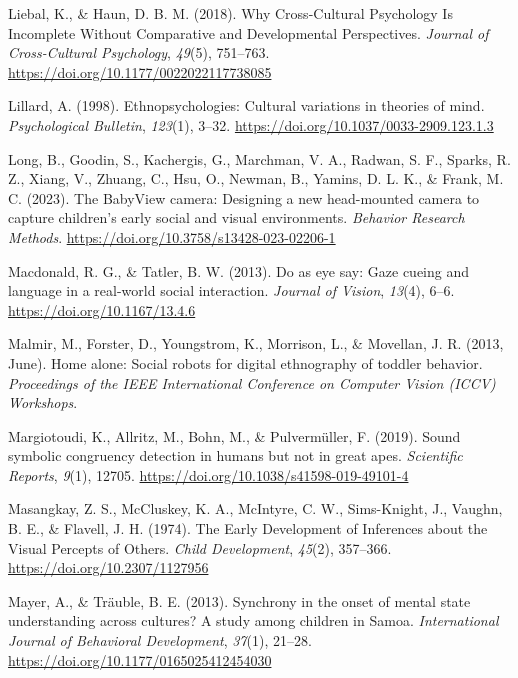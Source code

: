 \documentclass[
]{scrbook}
\newlength{\cslhangindent}
\newenvironment{CSLReferences}[2] %
 {\begin{list}{}{%
  \setlength{\itemindent}{0pt}
  \setlength{\leftmargin}{0pt}
  \setlength{\parsep}{0pt}
  \ifodd #1
   \setlength{\leftmargin}{\cslhangindent}
   \setlength{\itemindent}{-1\cslhangindent}
  \fi
  \setlength{\itemsep}{#2\baselineskip}}}
 {\end{list}}
\begin{document}
\begin{CSLReferences}{1}{0}
Liebal, K., \& Haun, D. B. M. (2018). Why {Cross-Cultural Psychology Is Incomplete Without Comparative} and {Developmental Perspectives}. \emph{Journal of Cross-Cultural Psychology}, \emph{49}(5), 751--763. \url{https://doi.org/10.1177/0022022117738085}

Lillard, A. (1998). Ethnopsychologies: {Cultural} variations in theories of mind. \emph{Psychological Bulletin}, \emph{123}(1), 3--32. \url{https://doi.org/10.1037/0033-2909.123.1.3}

Long, B., Goodin, S., Kachergis, G., Marchman, V. A., Radwan, S. F., Sparks, R. Z., Xiang, V., Zhuang, C., Hsu, O., Newman, B., Yamins, D. L. K., \& Frank, M. C. (2023). The {BabyView} camera: {Designing} a new head-mounted camera to capture children's early social and visual environments. \emph{Behavior Research Methods}. \url{https://doi.org/10.3758/s13428-023-02206-1}

Macdonald, R. G., \& Tatler, B. W. (2013). Do as eye say: {Gaze} cueing and language in a real-world social interaction. \emph{Journal of Vision}, \emph{13}(4), 6--6. \url{https://doi.org/10.1167/13.4.6}

Malmir, M., Forster, D., Youngstrom, K., Morrison, L., \& Movellan, J. R. (2013, June). Home alone: {Social} robots for digital ethnography of toddler behavior. \emph{Proceedings of the {IEEE} International Conference on Computer Vision ({ICCV}) Workshops}.

Margiotoudi, K., Allritz, M., Bohn, M., \& Pulvermüller, F. (2019). Sound symbolic congruency detection in humans but not in great apes. \emph{Scientific Reports}, \emph{9}(1), 12705. \url{https://doi.org/10.1038/s41598-019-49101-4}

Masangkay, Z. S., McCluskey, K. A., McIntyre, C. W., Sims-Knight, J., Vaughn, B. E., \& Flavell, J. H. (1974). The {Early Development} of {Inferences} about the {Visual Percepts} of {Others}. \emph{Child Development}, \emph{45}(2), 357--366. \url{https://doi.org/10.2307/1127956}

Mayer, A., \& Träuble, B. E. (2013). Synchrony in the onset of mental state understanding across cultures? {A} study among children in {Samoa}. \emph{International Journal of Behavioral Development}, \emph{37}(1), 21--28. \url{https://doi.org/10.1177/0165025412454030}


\end{CSLReferences}
\end{document}
